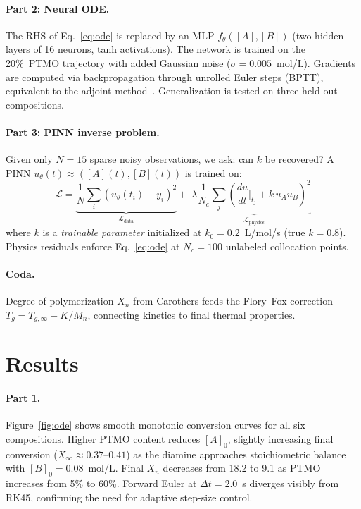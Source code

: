 \documentclass[10pt,twocolumn]{article}
\begin{document}
\paragraph{Part 2: Neural ODE.}
The RHS of Eq.~\eqref{eq:ode} is replaced by an MLP $f_\theta([A],[B])$
(two hidden layers of 16 neurons, tanh activations). The network is trained on
the 20\%~PTMO trajectory with added Gaussian noise ($\sigma=0.005$~mol/L).
Gradients are computed via backpropagation through unrolled Euler steps (BPTT),
equivalent to the adjoint method~\cite{chen2018}. Generalization is tested on
three held-out compositions.

\paragraph{Part 3: PINN inverse problem.}
Given only $N=15$ sparse noisy observations, we ask: can $k$ be recovered?
A PINN $u_\theta(t)\approx([A](t),[B](t))$ is trained on:
\begin{equation}
  \mathcal{L} = \underbrace{\frac{1}{N}\!\sum_{i}(u_\theta(t_i)-y_i)^2}_{\mathcal{L}_\text{data}}
  +\;\lambda\!\underbrace{\frac{1}{N_c}\!\sum_{j}\!\left(\frac{du}{dt}\bigg|_{t_j}
  +k\,u_A u_B\right)^{\!2}}_{\mathcal{L}_\text{physics}}
  \label{eq:pinn}
\end{equation}
where $k$ is a \textit{trainable parameter} initialized at $k_0=0.2$~L/mol/s
(true $k=0.8$). Physics residuals enforce Eq.~\eqref{eq:ode} at $N_c=100$
unlabeled collocation points.

\paragraph{Coda.}
Degree of polymerization $X_n$ from Carothers feeds the Flory--Fox correction
$T_g = T_{g,\infty} - K/M_n$, connecting kinetics to final thermal properties.

\section*{Results}

\paragraph{Part 1.}
Figure~\ref{fig:ode} shows smooth monotonic conversion curves for all six
compositions. Higher PTMO content reduces $[A]_0$, slightly increasing final
conversion ($X_\infty \approx 0.37$--$0.41$) as the diamine approaches
stoichiometric balance with $[B]_0 = 0.08$~mol/L. Final $X_n$ decreases
from 18.2 to 9.1 as PTMO increases from 5\% to 60\%. Forward Euler at
$\Delta t=2.0$~s diverges visibly from RK45, confirming the need for adaptive
step-size control.
\end{document}
